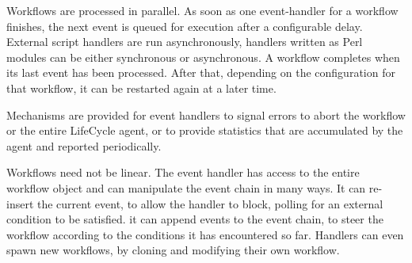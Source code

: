 Workflows are processed in parallel. As soon as one event-handler for a workflow finishes, the next event is queued for execution after a configurable delay. External script handlers are run asynchronously, handlers written as Perl modules can be either synchronous or asynchronous. A workflow completes when its last event has been processed. After that, depending on the configuration for that workflow, it can be restarted again at a later time.

Mechanisms are provided for event handlers to signal errors to abort the workflow or the entire LifeCycle agent, or to provide statistics that are accumulated by the agent and reported periodically.

Workflows need not be linear. The event handler has access to the entire workflow object and can manipulate the event chain in many ways. It can re-insert the current event, to allow the handler to block, polling for an external condition to be satisfied. it can append events to the event chain, to steer the workflow according to the conditions it has encountered so far. Handlers can even spawn new workflows, by cloning and modifying their own workflow.